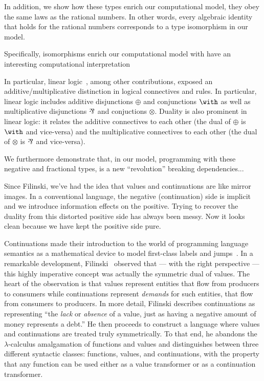 \documentclass[preprint]{sigplanconf}
\begin{document}
In addition, we show how these types enrich our computational model, they
obey the same laws as the rational numbers. In other words, every algebraic
identity that holds for the rational numbers corresponds to a type
isomorphism in our model.

Specifically, isomorphisms enrich our computational model with have an
interesting computational interpretation

In particular, linear logic~\cite{Girard87tcs}, among other contributions,
exposed an additive/multiplicative distinction in logical connectives and
rules. In particular, linear logic includes additive disjunctions $\oplus$
and conjunctions $\with$ as well as multiplicative disjunctions $\parr$ and
conjuctions $\otimes$. Duality is also prominent in linear logic: it relates
the additive connectives to each other (the dual of $\oplus$ is $\with$ and
vice-versa) and the multiplicative connectives to each other (the dual of
$\otimes$ is $\parr$ and vice-versa).

We furthermore demonstrate that, in our model,
programming with these negative and fractional types, is a new ``revolution''
breaking dependencies...

Since Filinski, we've had the
idea that values and continuations are like mirror images. In a conventional
language, the negative (continuation) side is implicit and we introduce
information effects on the positive. Trying to recover the duality from this
distorted positive side has always been messy. Now it looks clean because we
have kept the positive side pure.

Continuations made their introduction to the world of programming language
semantics as a mathematical device to model first-class labels and
jumps~\cite{springerlink:10.1023/A:1010026413531}. In a remarkable
development, Filinski~\cite{Filinski:1989:DCI:648332.755574} observed that
--- with the right perspective --- this highly imperative concept was
actually the symmetric dual of values. The heart of the observation is that
values represent entities that flow from producers to consumers while
continuations represent \emph{demands} for such entities, that flow from
consumers to producers. In more detail, Filinski describes continuations as
representing ``the \emph{lack} or \emph{absence} of a value, just as having a
negative amount of money represents a debt.'' He then proceeds to construct a
language where values and continuations are treated truly symmetrically. To
that end, he abandons the $\lambda$-calculus amalgamation of functions and
values and distinguishes between three different syntactic classes:
functions, values, and continuations, with the property that any function can
be used either as a value transformer or as a continuation transformer.
\end{document}
